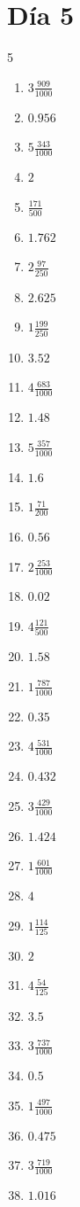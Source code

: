 \documentclass[12pt]{article}
\begin{document}
\section*{Día 5}
\begin{multicols}{5}\begin{enumerate}
\item $ 3 \frac{909}{1000} $
\item $ 0.956 $
\item $ 5 \frac{343}{1000} $
\item $ 2 $
\item $ \frac{171}{500} $
\item $ 1.762 $
\item $ 2 \frac{97}{250} $
\item $ 2.625 $
\item $ 1 \frac{199}{250} $
\item $ 3.52 $
\item $ 4 \frac{683}{1000} $
\item $ 1.48 $
\item $ 5 \frac{357}{1000} $
\item $ 1.6 $
\item $ 1 \frac{71}{200} $
\item $ 0.56 $
\item $ 2 \frac{253}{1000} $
\item $ 0.02 $
\item $ 4 \frac{121}{500} $
\item $ 1.58 $
\item $ 1 \frac{787}{1000} $
\item $ 0.35 $
\item $ 4 \frac{531}{1000} $
\item $ 0.432 $
\item $ 3 \frac{429}{1000} $
\item $ 1.424 $
\item $ 1 \frac{601}{1000} $
\item $ 4 $
\item $ 1 \frac{114}{125} $
\item $ 2 $
\item $ 4 \frac{54}{125} $
\item $ 3.5 $
\item $ 3 \frac{737}{1000} $
\item $ 0.5 $
\item $ 1 \frac{497}{1000} $
\item $ 0.475 $
\item $ 3 \frac{719}{1000} $
\item $ 1.016 $

\end{enumerate}
\end{multicols}
\end{document}
